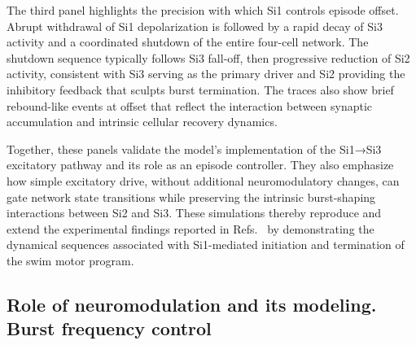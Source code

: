 \documentclass[nofootinbib,aip,amsmath,amssymb,reprint,twocolumn,10pt]{revtex4-2}
\begin{document}
The third panel highlights the precision with which Si1 controls episode offset. Abrupt withdrawal of Si1 depolarization is followed by a rapid decay of Si3 activity and a coordinated shutdown of the entire four-cell network. The shutdown sequence typically follows Si3 fall-off, then progressive reduction of Si2 activity, consistent with Si3 serving as the primary driver and Si2 providing the inhibitory feedback that sculpts burst termination. The traces also show brief rebound-like events at offset that reflect the interaction between synaptic accumulation and intrinsic cellular recovery dynamics.

Together, these panels validate the model's implementation of the Si1→Si3 excitatory pathway and its role as an episode controller. They also emphasize how simple excitatory drive, without additional neuromodulatory changes, can gate network state transitions while preserving the intrinsic burst-shaping interactions between Si2 and Si3. These simulations thereby reproduce and extend the experimental findings reported in Refs.~\cite{sakurai2019command, SakuraiKatz2016} by demonstrating the dynamical sequences associated with Si1-mediated initiation and termination of the swim motor program.


\subsection{Role of neuromodulation and its modeling. Burst frequency control}

\label{fig:supp} 
\end{document}
